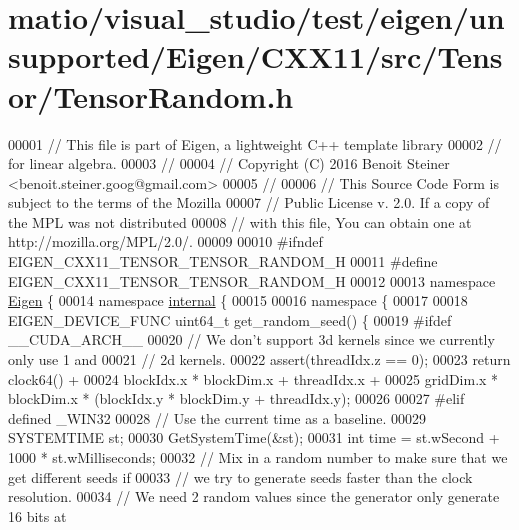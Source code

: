 \hypertarget{matio_2visual__studio_2test_2eigen_2unsupported_2_eigen_2_c_x_x11_2src_2_tensor_2_tensor_random_8h_source}{}\section{matio/visual\+\_\+studio/test/eigen/unsupported/\+Eigen/\+C\+X\+X11/src/\+Tensor/\+Tensor\+Random.h}
\label{matio_2visual__studio_2test_2eigen_2unsupported_2_eigen_2_c_x_x11_2src_2_tensor_2_tensor_random_8h_source}

\begin{DoxyCode}
00001 \textcolor{comment}{// This file is part of Eigen, a lightweight C++ template library}
00002 \textcolor{comment}{// for linear algebra.}
00003 \textcolor{comment}{//}
00004 \textcolor{comment}{// Copyright (C) 2016 Benoit Steiner <benoit.steiner.goog@gmail.com>}
00005 \textcolor{comment}{//}
00006 \textcolor{comment}{// This Source Code Form is subject to the terms of the Mozilla}
00007 \textcolor{comment}{// Public License v. 2.0. If a copy of the MPL was not distributed}
00008 \textcolor{comment}{// with this file, You can obtain one at http://mozilla.org/MPL/2.0/.}
00009 
00010 \textcolor{preprocessor}{#ifndef EIGEN\_CXX11\_TENSOR\_TENSOR\_RANDOM\_H}
00011 \textcolor{preprocessor}{#define EIGEN\_CXX11\_TENSOR\_TENSOR\_RANDOM\_H}
00012 
00013 \textcolor{keyword}{namespace }\hyperlink{namespace_eigen}{Eigen} \{
00014 \textcolor{keyword}{namespace }\hyperlink{namespaceinternal}{internal} \{
00015 
00016 \textcolor{keyword}{namespace }\{
00017 
00018 EIGEN\_DEVICE\_FUNC uint64\_t get\_random\_seed() \{
00019 \textcolor{preprocessor}{#ifdef \_\_CUDA\_ARCH\_\_}
00020   \textcolor{comment}{// We don't support 3d kernels since we currently only use 1 and}
00021   \textcolor{comment}{// 2d kernels.}
00022   assert(threadIdx.z == 0);
00023   \textcolor{keywordflow}{return} clock64() +
00024       blockIdx.x * blockDim.x + threadIdx.x +
00025       gridDim.x * blockDim.x * (blockIdx.y * blockDim.y + threadIdx.y);
00026 
00027 \textcolor{preprocessor}{#elif defined \_WIN32}
00028   \textcolor{comment}{// Use the current time as a baseline.}
00029   SYSTEMTIME st;
00030   GetSystemTime(&st);
00031   \textcolor{keywordtype}{int} time = st.wSecond + 1000 * st.wMilliseconds;
00032   \textcolor{comment}{// Mix in a random number to make sure that we get different seeds if}
00033   \textcolor{comment}{// we try to generate seeds faster than the clock resolution.}
00034   \textcolor{comment}{// We need 2 random values since the generator only generate 16 bits at}

\end{DoxyCode}
